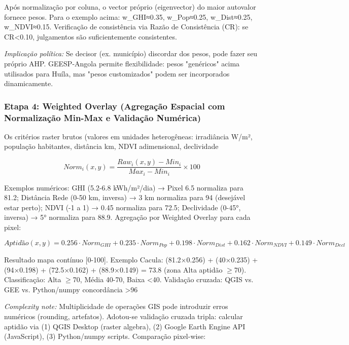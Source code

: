 \documentclass[12pt, a4paper]{article}
\begin{document}
Após normalização por coluna, o vector próprio (eigenvector) do maior autovalor fornece pesos. Para o exemplo acima: w_GHI≈0.35, w_Pop≈0.25, w_Dist≈0.25, w_NDVI≈0.15. Verificação de consistência via Razão de Consistência (CR): se CR<0.10, julgamentos são suficientemente consistentes.

\textit{Implicação política:} Se decisor (ex. município) discordar dos pesos, pode fazer seu próprio AHP. GEESP-Angola permite flexibilidade: pesos "genéricos" acima utilisados para Huíla, mas "pesos customizados" podem ser incorporados dinamicamente.

\subsubsection{Etapa 4: Weighted Overlay (Agregação Espacial com Normalização Min-Max e Validação Numérica)}

Os critérios raster brutos (valores em unidades heterogêneas: irradiância W/m², população habitantes, distância km, NDVI adimensional, declividade %

\begin{equation}
Norm_i(x,y) = \frac{Raw_i(x,y) - Min_i}{Max_i - Min_i} \times 100
\end{equation}

Exemplos numéricos: GHI (5.2-6.8 kWh/m²/dia) → Pixel 6.5 normaliza para 81.2; Distância Rede (0-50 km, inversa) → 3 km normaliza para 94 (desejável estar perto); NDVI (-1 a 1) → 0.45 normaliza para 72.5; Declividade (0-45°, inversa) → 5° normaliza para 88.9. Agregação por Weighted Overlay para cada pixel:

\begin{equation}
Aptidão(x,y) = 0.256 \cdot Norm_{GHI} + 0.235 \cdot Norm_{Pop} + 0.198 \cdot Norm_{Dist} + 0.162 \cdot Norm_{NDVI} + 0.149 \cdot Norm_{Decl}
\end{equation}

Resultado mapa contínuo [0-100]. Exemplo Cacula: (81.2×0.256) + (40×0.235) + (94×0.198) + (72.5×0.162) + (88.9×0.149) = 73.8 (zona Alta aptidão $\geq$70). Classificação: Alta $\geq$70, Média 40-70, Baixa <40. Validação cruzada: QGIS vs. GEE vs. Python/numpy concordância >96%

\textit{Complexity note:} Multiplicidade de operações GIS pode introduzir erros numéricos (rounding, artefatos). Adotou-se validação cruzada tripla: calcular aptidão via (1) QGIS Desktop (raster algebra), (2) Google Earth Engine API (JavaScript), (3) Python/numpy scripts. Comparação pixel-wise:
\end{document}
